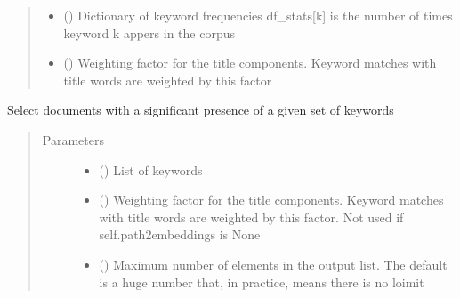 \documentclass[letterpaper,10pt,english]{sphinxmanual}
\begin{document}
\begin{fulllineitems}
\begin{fulllineitems}
\begin{quote}
\begin{description}
\begin{itemize}
\item {} 
\sphinxAtStartPar
{} () \textendash{} Dictionary of keyword frequencies
df\_stats{[}k{]} is the number of times keyword k appers in the corpus

\item {} 
\sphinxAtStartPar
{} () \textendash{} Weighting factor for the title components. Keyword matches with
title words are weighted by this factor

\end{itemize}


\end{description}\end{quote}

\end{fulllineitems}


\begin{fulllineitems}
\label{\detokenize{dc_preprocessor:src.domain_classifier.preprocessor.CorpusDFProcessor.filter_by_keywords}}
\sphinxAtStartPar
Select documents with a significant presence of a given set of keywords
\begin{quote}\begin{description}
\item[{Parameters}] \leavevmode\begin{itemize}
\item {} 
\sphinxAtStartPar
{} () \textendash{} List of keywords

\item {} 
\sphinxAtStartPar
{} () \textendash{} Weighting factor for the title components. Keyword matches with
title words are weighted by this factor. Not used if
self.path2embeddings is None

\item {} 
\sphinxAtStartPar
{} () \textendash{} Maximum number of elements in the output list. The default is
a huge number that, in practice, means there is no loimit


\end{itemize}
\end{description}
\end{quote}
\end{fulllineitems}
\end{fulllineitems}
\end{document}
